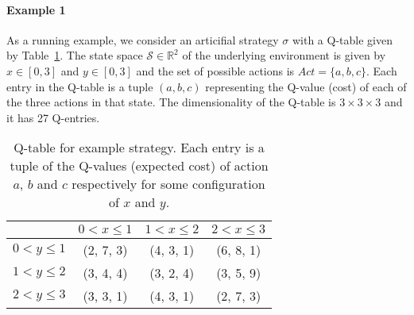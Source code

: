 \paragraph{Example 1}\label{ex:runningExample} As a running example, we consider
an articifial strategy $\sigma$ with a Q-table given by
Table~\ref{tab:exStrategyQTable}. The state space $\mathcal{S} \in \mathbb{R}^2
$ of the underlying environment is given by $x \in [0,3]$ and $y \in [0,3]$ and
the set of possible actions is $Act = \{ a, b, c \}$. Each entry in the Q-table
is a tuple $(a,b,c)$ representing the Q-value (cost) of each of the three
actions in that state. The dimensionality of the Q-table is $3 \times 3 \times
3$ and it has 27 Q-entries.

\begin{table}[htpb]
    \centering
    \caption{%
        Q-table for example strategy. Each entry is a tuple of the Q-values
        (expected cost) of action $a$, $b$ and $c$ respectively for some
        configuration of $x$ and $y$.
    }\label{tab:exStrategyQTable}
    \begin{tabular}{l@{\quad}c@{\quad}c@{\quad}c}
        \toprule
         & $0 < x \le 1$ & $1 < x \le 2$ & $2 < x \le 3$ \\
        \midrule
        $0 < y \le 1$ & (2, 7, 3) & (4, 3, 1) & (6, 8, 1) \\
        $1 < y \le 2$  & (3, 4, 4) & (3, 2, 4) & (3, 5, 9) \\
        $2 < y \le 3$  & (3, 3, 1) & (4, 3, 1) & (2, 7, 3) \\
        \bottomrule
    \end{tabular}
\end{table}


